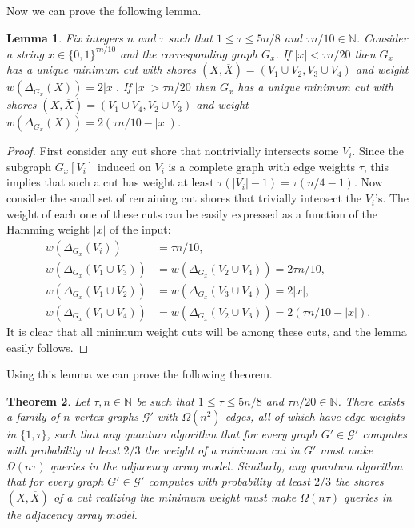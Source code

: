 \documentclass[10pt,a4paper]{article}
\newcommand{\N}{\mathbb{N}}
\newcommand{\Gcal}{\mathcal{G}}
\newcommand{\1}{\mathbf{1}}
\newtheorem{theorem}{Theorem}
\newtheorem{lemma}[theorem]{Lemma}
\theoremstyle{definition}
\begin{document}
\noindent
Now we can prove the following lemma.
\begin{lemma} \label{lem:adj-min-cut}
Fix integers $n$ and $\tau$ such that $1 \le \tau \le 5n/8$ and $\tau n/10 \in \N$.
Consider a string $x \in \{0,1\}^{\tau n/10}$ and the corresponding graph $G_x$.
If $|x| < \tau n/20$ then $G_x$ has a unique minimum cut with shores $(X,\overline X) = (V_1 \cup V_2, V_3 \cup V_4)$ and weight $w(\Delta_{G_x}(X)) = 2|x|$.
If $|x| > \tau n/20$ then $G_x$ has a unique minimum cut with shores $(X,\overline X) = (V_1 \cup V_4, V_2 \cup V_3)$ and weight $w(\Delta_{G_x}(X)) = 2(\tau n/10 - |x|)$.
\end{lemma}
\begin{proof}
First consider any cut shore that nontrivially intersects some $V_i$.
Since the subgraph $G_x[V_i]$ induced on $V_i$ is a complete graph with edge weights $\tau$, this implies that such a cut has weight at least $\tau (|V_i|-1) = \tau (n/4-1)$.
Now consider the small set of remaining cut shores that trivially intersect the $V_i$'s.
The weight of each one of these cuts can be easily expressed as a function of the Hamming weight $|x|$ of the input:
\begin{align*}
w(\Delta_{G_x}(V_i))
&= \tau n/10, \\
w(\Delta_{G_x}(V_1 \cup V_3)) &= w(\Delta_{G_x}(V_2 \cup V_4))
= 2 \tau n/10, \\
w(\Delta_{G_x}(V_1 \cup V_2)) &= w(\Delta_{G_x}(V_3 \cup V_4))
= 2 |x|, \\
w(\Delta_{G_x}(V_1 \cup V_4)) &= w(\Delta_{G_x}(V_2 \cup V_3))
= 2 (\tau n/10- |x|).
\end{align*}
It is clear that all minimum weight cuts will be among these cuts, and the lemma easily follows.
\end{proof}

Using this lemma we can prove the following theorem.


\begin{theorem}
\label{thm:adjlowerL}
Let $\tau, n \in \N$ be such that $1 \le \tau \le 5n/8$ and $\tau n/20 \in \N$.
There exists a family of $n$-vertex graphs $\Gcal'$ with $\Omega(n^2)$ edges, all of which have edge weights in $\{1,\tau\}$, such that any quantum algorithm that for every graph $G' \in \Gcal'$ computes with probability at least $2/3$ the weight of a minimum cut in $G'$ must make $\Omega(n \tau)$ queries in the adjacency array model.  Similarly, any quantum algorithm that for every graph $G' \in \Gcal'$ computes with probability at least $2/3$ the shores $(X,\overline{X})$ of a cut realizing the minimum weight must make $\Omega(n \tau)$ queries in the adjacency array model.
\end{theorem}
\end{document}
